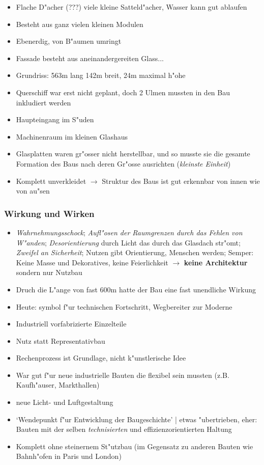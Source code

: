 \documentclass[emulatestandardclasses]{scrartcl}
\begin{document}
\begin{itemize}
  \item Flache D"acher (???) viele kleine Satteld"acher, Wasser kann gut ablaufen
  \item Besteht aus ganz vielen kleinen Modulen
  \item Ebenerdig, von B"aumen umringt
  \item Fassade besteht aus aneinandergereiten Glass...
  \item Grundriss: 563m lang 142m breit, 24m maximal h"ohe
  \item Querschiff war erst nicht geplant, doch 2 Ulmen mussten in den Bau inkludiert werden
  \item Haupteingang im S"uden
  \item Machinenraum im kleinen Glashaus
  \item Glasplatten waren gr"osser nicht herstellbar, und so musste sie die gesamte Formation des Baus nach deren Gr"osse ausrichten (\emph{kleinste Einheit})
  \item Komplett unverkleidet $\rightarrow$ Struktur des Baus ist gut erkennbar von innen wie von au"sen
\end{itemize}

\subsubsection{Wirkung und Wirken}
\begin{itemize}
  \item \emph{Wahrnehmungsschock}; \emph{Aufl"osen der Raumgrenzen durch das Fehlen von W"anden}; \emph{Desorientierung} durch Licht das durch das Glasdach str"omt; \emph{Zweifel an Sicherheit}; Nutzen gibt Orientierung, Menschen werden; Semper: Keine Masse und Dekoratives, keine Feierlichkeit $\rightarrow$ \textbf{keine Architektur} sondern nur Nutzbau
  \item Druch die L"ange von fast 600m hatte der Bau eine fast unendliche Wirkung 
  \item Heute: symbol f"ur technischen Fortschritt, Wegbereiter zur Moderne
  \item Industriell vorfabrizierte Einzelteile
  \item Nutz statt Representativbau
  \item Rechenprozess ist Grundlage, nicht k"unstlerische Idee
  \item War gut f"ur neue industrielle Bauten die flexibel sein mussten (z.B. Kaufh"auser, Markthallen)
  \item neue Licht- und Luftgestaltung
  \item `Wendepunkt f"ur Entwicklung der Baugeschichte' | etwas "ubertrieben, eher: Bauten mit der selben \emph{technisierten} und effizienzorientierten Haltung
  \item Komplett ohne steinernem St"utzbau (im Gegensatz zu anderen Bauten wie Bahnh"ofen in Paris und London)
\end{itemize}
\end{document}
